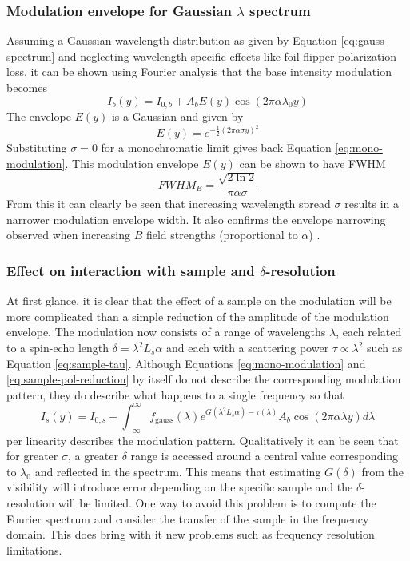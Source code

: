 \documentclass{article}
\begin{document}
\subsubsection{Modulation envelope for Gaussian $\lambda$ spectrum}
Assuming a Gaussian wavelength distribution as given by Equation \eqref{eq:gauss-spectrum} and neglecting wavelength-specific effects like foil flipper polarization loss, it can be shown using Fourier analysis that the base intensity modulation becomes
\begin{equation}
	I_b(y) = I_{0,b} + A_bE(y)\cos(2\pi\alpha\lambda_0y) \label{eq:poly-base-modulation}
\end{equation}
The envelope $E(y)$ is a Gaussian and given by
\begin{equation}
	E(y) = e^{-\frac{1}{2}\left(2\pi\alpha\sigma y\right)^2} \label{eq:poly-base-modulation-env}
\end{equation}
Substituting $\sigma=0$ for a monochromatic limit gives back Equation \eqref{eq:mono-modulation}. This modulation envelope $E(y)$ can be shown to have FWHM 
\begin{equation}
	FWHM_E = \frac{\sqrt{2\ln 2}}{\pi\alpha\sigma} \label{eq:poly-base-modulation-fwhm}
\end{equation}
From this it can clearly be seen that increasing wavelength spread $\sigma$ results in a narrower modulation envelope width. It also confirms the envelope narrowing observed when increasing $B$ field strengths (proportional to $\alpha$) \cite{bouwman2021}. 
\subsubsection{Effect on interaction with sample and $\delta$-resolution}
At first glance, it is clear that the effect of a sample on the modulation will be more complicated than a simple reduction of the amplitude of the modulation envelope. The modulation now consists of a range of wavelengths $\lambda$, each related to a spin-echo length $\delta = \lambda^2 L_s\alpha$ and each with a scattering power $\tau \propto\lambda^2$ such as Equation \eqref{eq:sample-tau}. Although Equations \eqref{eq:mono-modulation} and \eqref{eq:sample-pol-reduction} by itself do not describe the corresponding modulation pattern, they do describe what happens to a single frequency so that
\begin{equation}
	I_s(y) = I_{0,s} + \int_{-\infty}^\infty f_{\text{gauss}}(\lambda)e^{G(\lambda^2 L_s\alpha) - \tau(\lambda)}A_b\cos(2\pi\alpha\lambda y)d\lambda \label{eq:poly-sample-modulation}
\end{equation}
per linearity describes the modulation pattern. Qualitatively it can be seen that for greater $\sigma$, a greater $\delta$ range is accessed around a central value corresponding to $\lambda_0$ and reflected in the spectrum. This means that estimating $G(\delta)$ from the visibility will introduce error depending on the specific sample and the $\delta$-resolution will be limited. One way to avoid this problem is to compute the Fourier spectrum and consider the transfer of the sample in the frequency domain. This does bring with it new problems such as frequency resolution limitations. 
\end{document}
